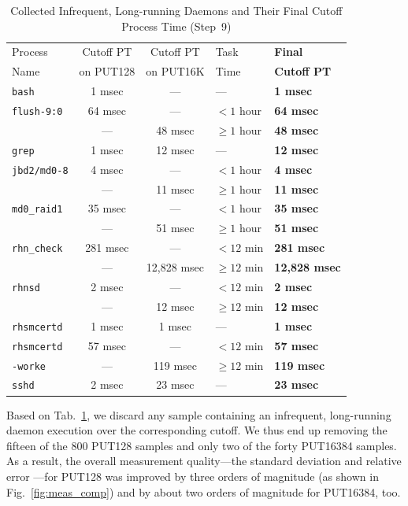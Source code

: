 \documentclass[letter]{ieice}
\begin{document}
\begin{table}[h]
\centering
{\scriptsize
\begin{tabular}{|p{1.2cm}|c|c|p{1cm}|p{1.45cm}|} \hline
Process  & Cutoff PT & Cutoff PT & Task  & {\bf Final } \\
 Name & on PUT128  & on PUT16K & Time & {\bf Cutoff PT} \\\hline
{\tt bash} & 1 msec & --- & --- & {\bf 1 msec} \\ \hline
{\tt flush-9:0} & 64 msec & --- & $< 1$ hour & {\bf 64 msec} \\
                & ---     & 48 msec & $\geq 1$ hour & {\bf 48 msec} \\ \hline
{\tt grep }     & 1 msec & 12 msec & --- & {\bf 12 msec}\\ \hline
{\tt jbd2/md0-8} & 4 msec & --- & $< 1$ hour & {\bf 4 msec} \\
                & ---     & 11 msec & $\geq 1$ hour & {\bf 11 msec} \\ \hline
{\tt md0\_raid1} & 35 msec & ---     & $< 1$ hour  & {\bf 35 msec}\\
                 & ---     & 51 msec & $\geq 1$ hour & {\bf 51 msec} \\ \hline
{\tt rhn\_check}  & 281 msec & --- & $< 12$ min & {\bf 281 msec} \\
                 &  --- & 12,828 msec & $\geq 12$ min & {\bf 12,828 msec}\\ \hline
{\tt rhnsd} & 2 msec & --- & $< 12$ min & {\bf 2 msec} \\
            & ---    & 12 msec &$\geq 12$ min & {\bf 12 msec} \\ \hline
{\tt rhsmcertd}  & 1 msec & 1 msec & --- & {\bf 1 msec} \\  \hline
{\tt rhsmcertd}  & 57 msec & --- & $< 12$ min & {\bf 57 msec} \\
{\tt -worke}           &  --- & 119 msec  & $\geq 12$ min & {\bf 119 msec}\\ \hline
{\tt sshd} & 2 msec & 23 msec & --- & {\bf 23 msec}\\ \hline
\end{tabular}
}
\caption{Collected Infrequent, Long-running Daemons and Their Final Cutoff
  Process Time \hbox{(Step~9)}\label{tab:final_infrequent_cutoff}}
  \vspace{-0.4in}
\end{table}

Based on Tab.~\ref{tab:final_infrequent_cutoff}, 
we discard any sample containing an infrequent, long-running daemon execution
over the corresponding cutoff. We thus end up removing the fifteen of the 800
PUT128 samples and only two of the forty PUT16384 samples. 
As a result, the overall measurement quality---the standard deviation and relative error 
---for PUT128 was improved 
by three orders of magnitude (as shown in Fig.~\ref{fig:meas_comp}) 
and by about two orders of magnitude for PUT16384, too.
\end{document}
